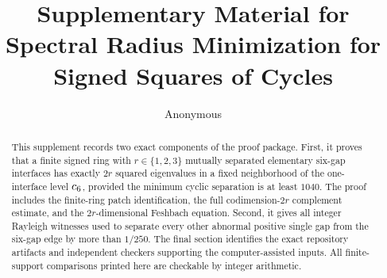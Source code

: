 \title{Supplementary Material for\\
Spectral Radius Minimization for Signed Squares of Cycles}
\author{Anonymous}
\date{}
\maketitle

\begin{abstract}
This supplement records two exact components of the proof package.  First,
it proves that a finite signed ring with \(r\in\{1,2,3\}\) mutually separated
elementary six-gap interfaces has exactly \(2r\) squared eigenvalues in a
fixed neighborhood of the one-interface level \(c_6\), provided the
minimum cyclic separation is at least \(1040\).  The proof includes the
finite-ring patch identification, the full codimension-\(2r\) complement
estimate, and the \(2r\)-dimensional Feshbach equation.  Second, it gives
all integer Rayleigh witnesses used to separate every other abnormal
positive single gap from the six-gap edge by more than \(1/250\).  The final
section identifies the exact repository artifacts and independent checkers
supporting the computer-assisted inputs.  All finite-support comparisons
printed here are checkable by integer arithmetic.
\end{abstract}

\tableofcontents
\clearpage
